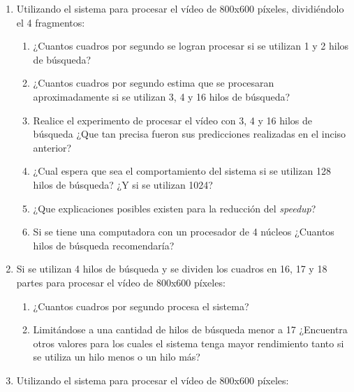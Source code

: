\begin{enumerate}

	\item{Utilizando el sistema para procesar el vídeo de 800x600 píxeles,
		dividiéndolo el 4 fragmentos:

\begin{enumerate}

	\item{¿Cuantos cuadros por segundo se logran procesar si se utilizan 1 y
		2 hilos de búsqueda?}

	\item{¿Cuantos cuadros por segundo estima que se procesaran
		aproximadamente si se utilizan 3, 4 y 16 hilos de búsqueda?}

	\item{Realice el experimento de procesar el vídeo con 3, 4 y 16 hilos de
		búsqueda ¿Que tan precisa fueron sus predicciones realizadas en
		el inciso anterior?}

	\item{¿Cual espera que sea el comportamiento del sistema si se utilizan
		128 hilos de búsqueda? ¿Y si se utilizan 1024?}

	\item{¿Que explicaciones posibles existen para la reducción del
		\emph{speedup}?}

	\item{Si se tiene una computadora con un procesador de 4 núcleos
		¿Cuantos hilos de búsqueda recomendaría?}

\end{enumerate}}

	\item{Si se utilizan 4 hilos de búsqueda y se dividen los cuadros en 16,
		17 y 18 partes para procesar el vídeo de 800x600 píxeles:

\begin{enumerate}

	\item{¿Cuantos cuadros por segundo procesa el sistema?}

	\item{Limitándose a una cantidad de hilos de búsqueda menor a 17
		¿Encuentra otros valores para los cuales el sistema tenga mayor
		rendimiento tanto si se utiliza un hilo menos o un hilo más?}

\end{enumerate}}

	\item{Utilizando el sistema para procesar el vídeo de 800x600 píxeles:

}
\end{enumerate}
